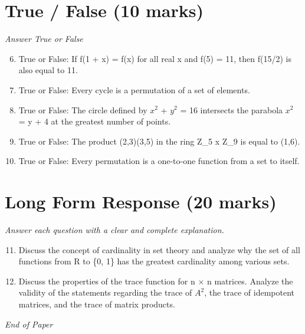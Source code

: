 \documentclass[12pt]{article}
\begin{document}
\section*{True / False (10 marks)}
\textit{Answer True or False}
\begin{enumerate}[label=\arabic*.]
\setcounter{enumi}{5}
\item True or False: If f(1 + x) = f(x) for all real x and f(5) = 11, then f(15/2) is also equal to 11.
\item True or False: Every cycle is a permutation of a set of elements.
\item True or False: The circle defined by $x^2$ + $y^2$ = 16 intersects the parabola $x^2$ = y + 4 at the greatest number of points.
\item True or False: The product (2,3)(3,5) in the ring Z\_5 x Z\_9 is equal to (1,6).
\item True or False: Every permutation is a one-to-one function from a set to itself.
\end{enumerate}

\section*{Long Form Response (20 marks)}
\textit{Answer each question with a clear and complete explanation.}
\begin{enumerate}[label=\arabic*.]
\setcounter{enumi}{10}
\item Discuss the concept of cardinality in set theory and analyze why the set of all functions from R to \{0, 1\} has the greatest cardinality among various sets.
\item Discuss the properties of the trace function for n \ensuremath{\times} n matrices. Analyze the validity of the statements regarding the trace of $A^2$, the trace of idempotent matrices, and the trace of matrix products.
\end{enumerate}

\vfill
\noindent\textit{End of Paper}
\end{document}

